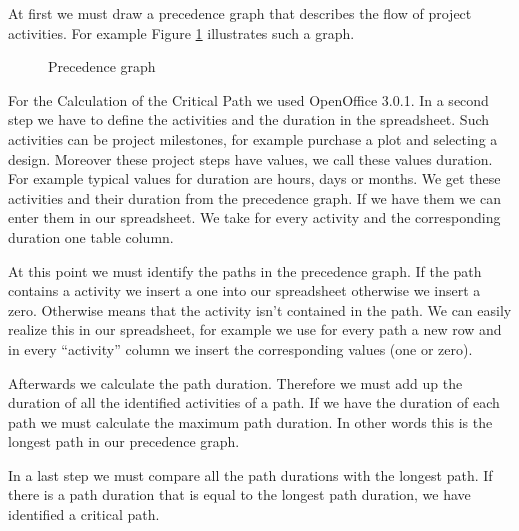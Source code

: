 At first we must draw a precedence graph that describes the flow of project activities. For example Figure \ref{pic:seqChart}  illustrates such a graph. 

\begin{figure}[h] 
\centerline{}
\caption{Precedence graph \cite{exceluse}}
\label{pic:seqChart}
\end{figure}

For the Calculation of the Critical Path we used OpenOffice 3.0.1. 
In a second step we have to define the activities and the duration in the spreadsheet. Such activities can be project milestones, for example purchase a plot and selecting a design. Moreover these project steps have values, we call these values duration. For example typical values for duration are hours, days or months. We get these activities and their duration from the precedence graph. If we have them we can enter them in our spreadsheet. We take for every activity and the corresponding duration one table column.

At this point we must identify the paths in the precedence graph. If the path contains a activity we insert a one into our spreadsheet otherwise we insert a zero. Otherwise means that the activity isn't contained in the path.  We can easily realize this in our spreadsheet, for example we use for every path a new row and in every “activity” column we insert the corresponding values (one or zero). 

Afterwards we calculate the path duration. Therefore we must add up the duration of all the identified activities of a path. If we have the duration of each path we must calculate the maximum path duration. In other words this is the longest path in our precedence graph.

In a last step we must compare all the path durations with the longest path. If there is a path duration that is equal to the longest path duration, we have identified a critical path.
 
